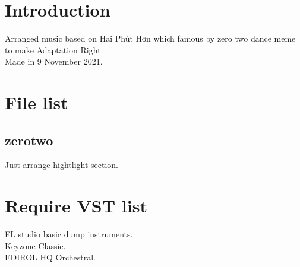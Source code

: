 \documentclass{article}
\author{Seycho Han}
\date{XX XX 2022}
\begin{document}
\begin{CJK}{UTF8}{ipxm}

\section{Introduction}
Arranged music based on Hai Phút Hơn\cite{haiphuthon} which famous by zero two dance meme\cite{zerotwo} to make Adaptation Right.\\
Made in 9 November 2021.
\\

\section{File list}
\subsection{zerotwo}
Just arrange hightlight section.
\\

\section{Require VST list}
FL studio basic dump instruments\cite{flstudio}. \\
Keyzone Classic\cite{keyzone}. \\
EDIROL HQ Orchestral\cite{edirol}.
\\




\end{CJK}
\end{document}
